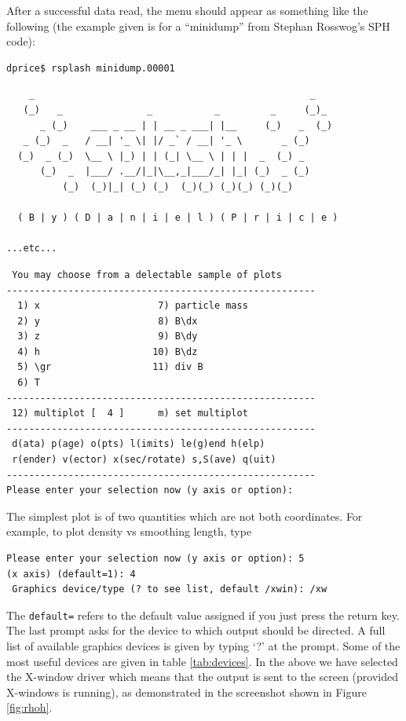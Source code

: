 \documentclass[a4paper,10pt]{article}
\begin{document}
After a successful data read, the menu should appear as something like the
following (the example given is for a ``minidump'' from Stephan Rosswog's SPH code):
\begin{verbatim}
dprice$ rsplash minidump.00001 
\end{verbatim}
\begin{verbatim}
    _                                                 _  
   (_)   _               _           _         _     (_)_
      _ (_)    ___ _ __ | | __ _ ___| |__     (_)   _  (_)
   _ (_)  _   / __| '_ \| |/ _` / __| '_ \       _ (_)    
  (_)  _ (_)  \__ \ |_) | | (_| \__ \ | | |  _  (_) _    
      (_)  _  |___/ .__/|_|\__,_|___/_| |_| (_)  _ (_)   
          (_)  (_)|_| (_) (_)  (_)(_) (_)(_) (_)(_)     

  ( B | y ) ( D | a | n | i | e | l ) ( P | r | i | c | e )

...etc...
\end{verbatim}
\begin{verbatim}
 You may choose from a delectable sample of plots 
-------------------------------------------------------
  1) x                     7) particle mass       
  2) y                     8) B\dx                
  3) z                     9) B\dy                
  4) h                    10) B\dz                
  5) \gr                  11) div B               
  6) T                   
-------------------------------------------------------
 12) multiplot [  4 ]      m) set multiplot 
-------------------------------------------------------
 d(ata) p(age) o(pts) l(imits) le(g)end h(elp)
 r(ender) v(ector) x(sec/rotate) s,S(ave) q(uit)
-------------------------------------------------------
Please enter your selection now (y axis or option):
\end{verbatim}
The simplest plot is of two quantities which are not both coordinates. For
example, to plot density vs smoothing length, type
\begin{verbatim}
Please enter your selection now (y axis or option): 5
(x axis) (default=1): 4
 Graphics device/type (? to see list, default /xwin): /xw
\end{verbatim}
 The \verb+default=+ refers to the default value assigned if you just press the return key. The last prompt asks for the device to which output should be directed. A full list of available graphics devices is given by typing `?' at the prompt. Some of the most useful devices are given in table \ref{tab:devices}. In the
above we have selected the X-window driver which means that the output is sent to the
screen (provided X-windows is running), as demonstrated in the screenshot shown in Figure \ref{fig:rhoh}. 
\end{document}

